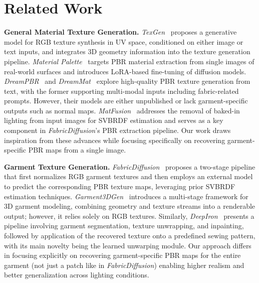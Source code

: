 \documentclass[11pt,twocolumn]{article}
\begin{document}
\section{Related Work}

\textbf{General Material Texture Generation.} \textit{TexGen}~\cite{texgen} proposes a generative model for RGB texture synthesis in UV space, 
conditioned on either image or text inputs, and integrates 3D geometry information into the texture generation pipeline. 
\textit{Material Palette}~\cite{materialpalette} targets PBR material extraction from single images of 
real-world surfaces and introduces LoRA-based fine-tuning of diffusion models. 
\textit{DreamPBR}~\cite{dreampbr} and \textit{DreamMat}~\cite{dreammat} explore high-quality PBR texture generation from text, with the 
former supporting multi-modal inputs including fabric-related prompts. 
However, their models are either unpublished or lack garment-specific outputs such as normal maps. 
\textit{MatFusion}~\cite{matfusion} addresses the removal of baked-in lighting from input images for SVBRDF 
estimation and serves as a key component in \textit{FabricDiffusion}'s PBR extraction pipeline. Our work draws 
inspiration from these advances while focusing specifically on recovering garment-specific PBR maps from a single image.

\textbf{Garment Texture Generation.} \textit{FabricDiffusion}~\cite{fabricdiffusion} proposes a two-stage pipeline that first normalizes RGB garment textures 
and then employs an external model to predict the corresponding PBR texture maps, leveraging prior SVBRDF estimation techniques. 
\textit{Garment3DGen}~\cite{garment3dgen} introduces a multi-stage framework for 3D garment modeling, combining geometry and texture streams into a 
renderable output; however, it relies solely on RGB textures. Similarly, \textit{DeepIron}~\cite{deepiron} presents a pipeline involving garment segmentation, 
texture unwrapping, and inpainting, followed by application of the recovered texture onto a predefined sewing pattern, 
with its main novelty being the learned unwarping module. Our approach differs in focusing explicitly on recovering garment-specific PBR maps for the 
entire garment (not just a patch like in \textit{FabricDiffusion}) enabling higher realism and better generalization across lighting conditions.
\end{document}
